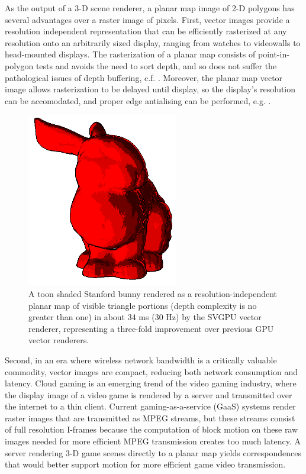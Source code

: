 \documentclass[review]{acmsiggraph}
\begin{document}
As the output of a 3-D scene renderer, a planar map image of 2-D polygons has
several advantages over a raster image of pixels. First, vector images provide
a resolution independent representation that can be efficiently rasterized at
any resolution onto an arbitrarily sized display, ranging from watches to
videowalls to head-mounted displays. The rasterization of a planar map consists
of point-in-polygon
tests and avoids the need to sort depth, and so does not suffer the
pathological issues of depth buffering, c.f. \cite{lapidous1999}. Moreover, the
planar map vector image allows rasterization to be delayed until display, so
the display's resolution can be accomodated, and proper edge antialising can be
performed, e.g. \cite{manson2011}.

\begin{figure}[t] \centering
\includegraphics[height=3in]{images/bunny-red.png}
\caption{A toon shaded Stanford bunny rendered as a resolution-independent
planar map of visible triangle portions (depth complexity is no greater than
one) in about 34 ms (30 Hz) by the SVGPU vector renderer, representing a
three-fold improvement over previous GPU vector renderers.}
\end{figure}

Second, in an era where wireless network bandwidth is a critically
valuable commodity, vector images are compact, reducing both network
consumption and latency. Cloud gaming is an emerging trend of the video gaming
industry, where the display image of a video game is rendered by a server and
transmitted over the internet to a thin client. Current gaming-as-a-service
(GaaS) systems render raster images that are transmitted as MPEG streams, but
these streams consist of full resolution I-frames because the computation of
block motion on these raw images needed for more efficient MPEG transmission
creates too much latency. A server rendering 3-D game scenes directly to a
planar map yields correspondences that would better support motion for more
efficient game video transmission.
\end{document}
